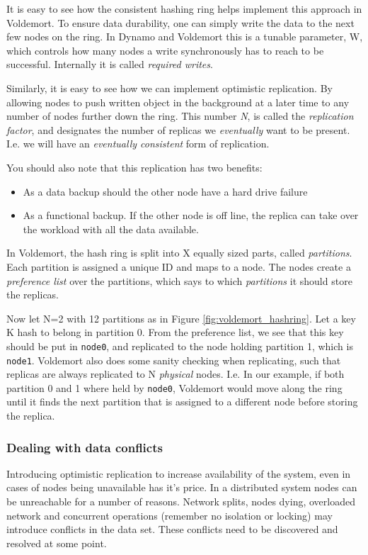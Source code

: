 It is easy to see how the consistent hashing ring helps implement this approach in Voldemort.
To ensure data durability, one can simply write the data to the next few nodes on the ring. In Dynamo and Voldemort this is a tunable parameter, W, which controls how many nodes a write synchronously has to reach to be successful. 
Internally it is called \emph{required writes}.

Similarly, it is easy to see how we can implement optimistic replication.
By allowing nodes to push written object in the background at a later time to any number of nodes further down the ring.
This number \emph{N}, is called the \emph{replication factor}, and designates the number of replicas we \emph{eventually} want to be present.
I.e. we will have an \emph{eventually consistent} form of replication.

You should also note that this replication has two benefits: 
\begin{itemize}
	\item As a data backup should the other node have a hard drive failure
	\item As a functional backup. If the other node is off line, the replica can take over the workload with all the data available.
\end{itemize}

In Voldemort, the hash ring is split into X equally sized parts, called \emph{partitions}. Each partition is assigned a unique ID and maps to a node.
The nodes create a \emph{preference list} over the partitions, which says to which \emph{partitions} it should store the replicas.

Now let N=2 with 12 partitions as in Figure \ref{fig:voldemort_hashring}. 
Let a key K hash to belong in partition 0. From the preference list, we see that this key should be put in \texttt{node0}, and replicated to the node holding partition 1, which is \texttt{node1}.
Voldemort also does some sanity checking when replicating, such that replicas are always replicated to N \emph{physical} nodes. 
I.e. In our example, if both partition 0 and 1 where held by \texttt{node0}, Voldemort would move along the ring until it finds the next partition that is assigned to a different node before storing the replica.

\subsubsection{Dealing with data conflicts}
Introducing optimistic replication to increase availability of the system, even in cases of nodes being unavailable has it's price. 
In a distributed system nodes can be unreachable for a number of reasons.
Network splits, nodes dying, overloaded network and concurrent operations (remember no isolation or locking) may introduce conflicts in the data set.
These conflicts need to be discovered and resolved at some point.

